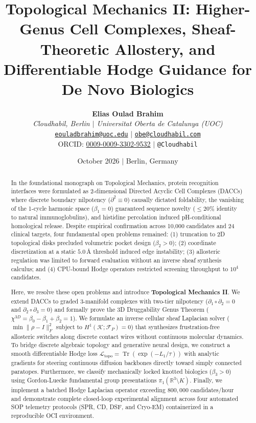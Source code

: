 \documentclass[11pt, a4paper]{article}
\title{\textbf{Topological Mechanics II: Higher-Genus Cell Complexes, Sheaf-Theoretic Allostery, and Differentiable Hodge Guidance for De Novo Biologics}}
\author{
    \textbf{Elias Oulad Brahim} \\
    \textit{Cloudhabil, Berlin $\mid$ Universitat Oberta de Catalunya (UOC)} \\
    \href{mailto:eouladbrahim@uoc.edu}{\texttt{eouladbrahim@uoc.edu}} $\mid$ \href{mailto:obe@cloudhabil.com}{\texttt{obe@cloudhabil.com}} \\
    ORCID: \href{https://orcid.org/0009-0009-3302-9532}{0009-0009-3302-9532} $\mid$ \texttt{@Cloudhabil}
}
\date{October 2026 $\mid$ Berlin, Germany}
\theoremstyle{definition}
\theoremstyle{plain}
\theoremstyle{remark}
\begin{document}
\maketitle

\begin{abstract}
In the foundational monograph on Topological Mechanics, protein recognition interfaces were formulated as 2-dimensional Directed Acyclic Cell Complexes (DACCs) where discrete boundary nilpotency ($\partial^2 \equiv 0$) causally dictated foldability, the vanishing of the 1-cycle harmonic space ($\beta_1 = 0$) guaranteed sequence novelty ($\le 20\%$ identity to natural immunoglobulins), and histidine percolation induced pH-conditional homological release. Despite empirical confirmation across 10,000 candidates and 24 clinical targets, four fundamental open problems remained: (1) truncation to 2D topological disks precluded volumetric pocket design ($\beta_2 > 0$); (2) coordinate discretization at a static $5.0\,\text{\AA}$ threshold induced edge instability; (3) allosteric regulation was limited to forward evaluation without an inverse sheaf synthesis calculus; and (4) CPU-bound Hodge operators restricted screening throughput to $10^4$ candidates.

Here, we resolve these open problems and introduce \textbf{Topological Mechanics II}. We extend DACCs to graded 3-manifold complexes with two-tier nilpotency ($\partial_1 \circ \partial_2 = 0$ and $\partial_2 \circ \partial_3 = 0$) and formally prove the 3D Druggability Genus Theorem ($\chi^{3D} = \beta_0 - \beta_1 + \beta_2 = 1$). We formulate an inverse cellular sheaf Laplacian solver ($\min \|\rho - I\|_F^2$ subject to $H^1(\mathcal{K}; \mathcal{F}_P) = 0$) that synthesizes frustration-free allosteric switches along discrete contact wires without continuous molecular dynamics. To bridge discrete algebraic topology and generative neural design, we construct a smooth differentiable Hodge loss $\mathcal{L}_{\text{topo}} = \operatorname{Tr}(\exp(-L_1/\tau))$ with analytic gradients for steering continuous diffusion backbones directly toward simply connected paratopes. Furthermore, we classify mechanically locked knotted biologics ($\beta_3 > 0$) using Gordon-Luecke fundamental group presentations $\pi_1(\mathbb{R}^3 \setminus K)$. Finally, we implement a batched Hodge Laplacian operator exceeding $800,000$ candidates/hour and demonstrate complete closed-loop experimental alignment across four automated SOP telemetry protocols (SPR, CD, DSF, and Cryo-EM) containerized in a reproducible OCI environment.
\end{abstract}
\end{document}
